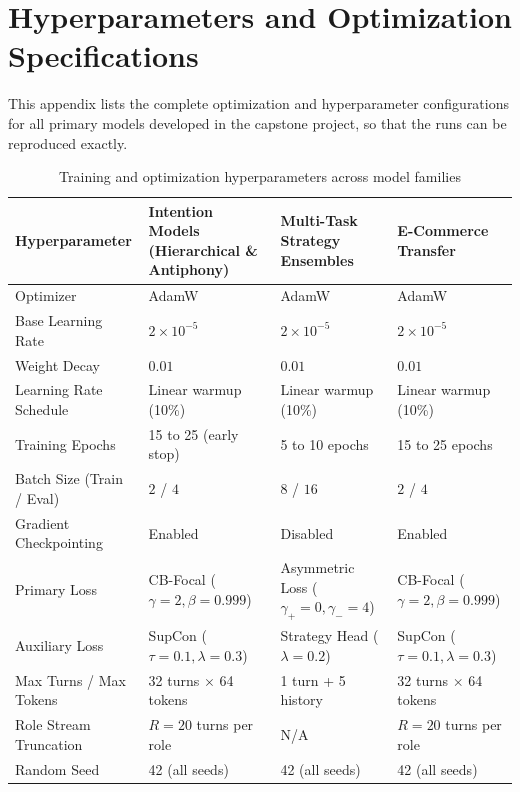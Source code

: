 \chapter{Hyperparameters and Optimization Specifications}
\label{app:hyperparameters}

This appendix lists the complete optimization and hyperparameter configurations for all primary models developed in the capstone project, so that the runs can be reproduced exactly.

\begin{table}[htbp]
  \centering
  \small
  \caption{Training and optimization hyperparameters across model families}
  \label{tab:app-hyperparams}
  \begin{tabularx}{\textwidth}{lYYY}
    \toprule
    \textbf{Hyperparameter} & \textbf{Intention Models (Hierarchical \& Antiphony)} & \textbf{Multi-Task Strategy Ensembles} & \textbf{E-Commerce Transfer} \\
    \midrule
    Optimizer & AdamW \cite{loshchilov2019adamw} & AdamW & AdamW \\
    Base Learning Rate & $2 \times 10^{-5}$ & $2 \times 10^{-5}$ & $2 \times 10^{-5}$ \\
    Weight Decay & $0.01$ & $0.01$ & $0.01$ \\
    Learning Rate Schedule & Linear warmup (10\%) & Linear warmup (10\%) & Linear warmup (10\%) \\
    Training Epochs & 15 to 25 (early stop) & 5 to 10 epochs & 15 to 25 epochs \\
    Batch Size (Train / Eval) & $2$ / $4$ & $8$ / $16$ & $2$ / $4$ \\
    Gradient Checkpointing & Enabled & Disabled & Enabled \\
    Primary Loss & CB-Focal ($\gamma=2, \beta=0.999$) & Asymmetric Loss ($\gamma_+=0, \gamma_-=4$) & CB-Focal ($\gamma=2, \beta=0.999$) \\
    Auxiliary Loss & SupCon ($\tau=0.1, \lambda=0.3$) & Strategy Head ($\lambda=0.2$) & SupCon ($\tau=0.1, \lambda=0.3$) \\
    Max Turns / Max Tokens & 32 turns $\times$ 64 tokens & 1 turn + 5 history & 32 turns $\times$ 64 tokens \\
    Role Stream Truncation & $R=20$ turns per role & N/A & $R=20$ turns per role \\
    Random Seed & 42 (all seeds) & 42 (all seeds) & 42 (all seeds) \\
    \bottomrule
  \end{tabularx}
\end{table}

